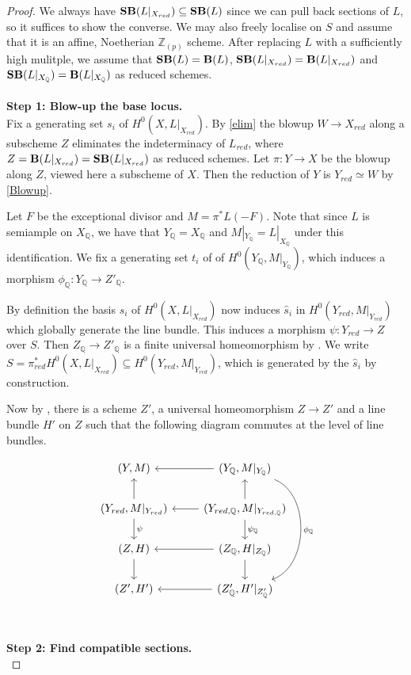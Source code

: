 \begin{proof}
	We always have $\mathbf{SB}(L|_{X_{red}}) \subseteq \mathbf{SB}(L)$ since we can pull back sections of $L$, so it suffices to show the converse. We may also freely localise on $S$ and assume that it is an affine, Noetherian $\mathbb{Z}_{(p)}$ scheme. After replacing $L$ with a sufficiently high mulitple, we assume that $\mathbf{SB}(L)=\mathbf{B}(L)$, $\mathbf{SB}(L|_{X_{red}})=\mathbf{B}(L|_{X_{red}})$ and $\mathbf{SB}(L|_{X_{\mathbb{Q}}})=\mathbf{B}(L|_{X_{\mathbb{Q}}})$ as reduced schemes.\\
	\\
	\textbf{Step 1: Blow-up the base locus.}\\
	
	Fix a generating set $s_{i}$ of $H^{0}(X,L|_{X_{red}})$. By \autoref{elim} the blowup $W\to X_{red}$ along a subscheme $Z$ eliminates the indeterminacy of $L_{red}$, where $Z=\mathbf{B}(L|_{X_{red}})=\mathbf{SB}(L|_{X_{red}})$ as reduced schemes. Let $\pi:Y \to X$ be the blowup along $Z$, viewed here a subscheme of $X$. Then the reduction of $Y$ is $Y_{red}\simeq W$ by \autoref{Blowup}.
	
	Let $F$ be the exceptional divisor and $M = \pi^{*}L(-F)$. Note that since $L$ is semiample on $X_{\mathbb{Q}}$, we have that $Y_{\mathbb{Q}}=X_{\mathbb{Q}}$ and $M|_{Y_{\mathbb{Q}}}=L|_{X_{\mathbb{Q}}}$ under this identification. We fix a generating set $t_{i}$ of of $H^{0}(Y_{\mathbb{Q}},M|_{Y_{\mathbb{Q}}})$, which induces a morphism $\phi_{\mathbb{Q}}\colon Y_{\mathbb{Q}} \to Z'_{\mathbb{Q}}$.
	
	By definition the basis $s_{i}$ of $H^{0}(X,L|_{X_{red}})$ now induces $\hat{s}_{i}$ in $H^{0}(Y_{red},M|_{Y_{red}})$ which globally generate the line bundle. This induces a morphism $\psi: Y_{red} \to Z$ over $S$. Then $Z_{\mathbb{Q}} \to Z'_{\mathbb{Q}}$ is a finite universal homeomorphism by \cite[Tag 02OG]{stacks-project}. We write $S=\pi^{*}_{red}H^{0}(X,L|_{X_{red}}) \subseteq H^{0}(Y_{red},M|_{Y_{red}})$, which is generated by the $\hat{s}_{i}$ by construction. 
	
	Now by \cite[Theorem 1.7, Corollary 4.20 and Lemma 2.20]{witaszek2020keel}, there is a scheme $Z'$, a universal homeomorphism $Z \to Z'$ and a line bundle $H'$ on $Z$ such that the following diagram commutes at the level of line bundles.
	
	\[\begin{tikzcd}
	{(Y,M)}                                 & {(Y_{\mathbb{Q}},M|_{Y_{\mathbb{Q}}})} \arrow[ddd, bend left=70, "\phi_{\mathbb{Q}}"] \arrow[l]     \\
	{(Y_{red},M|_{Y_{red}})} \arrow[d, "\psi"] \arrow[u] & {(Y_{red, \mathbb{Q}},M|_{Y_{red, \mathbb{Q}}})} \arrow[d, "\psi_{\mathbb{Q}}"] \arrow[u] \arrow[l] \\
	{(Z,H)} \arrow[d]                       & {(Z_{\mathbb{Q}},H|_{Z_{\mathbb{Q}}})} \arrow[l] \arrow[d]                    \\
	{(Z',H')}                               & {(Z'_{\mathbb{Q}},H'|_{Z'_{\mathbb{Q}}})} \arrow[l]                            
	\end{tikzcd}\]\\
	\\
	\textbf{Step 2: Find compatible sections.}\\
	

\end{proof}
